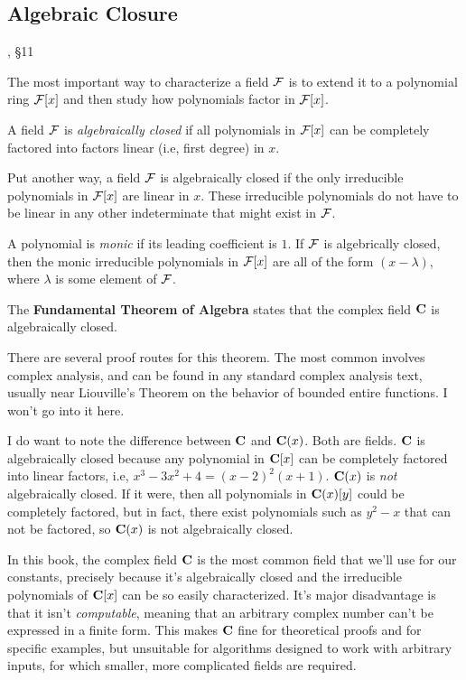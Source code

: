 \subsection*{\qquad Algebraic Closure}
, \S11

The most important way to characterize a field ${\cal F}$ is to extend
it to a polynomial ring ${\cal F}[x]$ and then study how polynomials
factor in ${\cal F}[x]$.

\begin{key point}
A field ${\cal F}$ is {\it algebraically closed} if all
polynomials in ${\cal F}[x]$ can be completely factored
into factors linear (i.e, first degree) in $x$.
\end{key point}

Put another way, a field ${\cal F}$ is algebraically closed if the
only irreducible polynomials in ${\cal F}[x]$ are linear in $x$.
These irreducible polynomials do not have to be linear in any other
indeterminate that might exist in ${\cal F}$.

A polynomial is {\it monic} if its leading coefficient is $1$.  If
${\cal F}$ is algebrically closed, then the monic irreducible
polynomials in ${\cal F}[x]$ are all of the form $(x-\lambda)$, where
$\lambda$ is some element of ${\cal F}$.

\begin{key point}
The {\bf Fundamental Theorem of
Algebra} states that the complex field ${\bf C}$ is algebraically
closed.
\end{key point}

There are several proof routes for this theorem.  The most
common involves complex analysis, and can be found in any standard
complex analysis text, usually near Liouville's Theorem on the
behavior of bounded entire functions.  I won't go into it here.

I do want to note the difference between ${\bf C}$ and ${\bf C}(x)$.
Both are fields.  ${\bf C}$ is algebraically closed because any
polynomial in ${\bf C}[x]$ can be completely factored into linear
factors, i.e, $x^3-3x^2+4=(x-2)^2(x+1)$.  ${\bf C}(x)$ is {\it not} algebraically closed.
If it were, then all polynomials in ${\bf C}(x)[y]$ could
be completely factored, but in fact, there exist polynomials
such as $y^2-x$ that can not be factored, so ${\bf C}(x)$
is not algebraically closed.

In this book, the complex field ${\bf C}$ is the most common field
that we'll use for our constants, precisely because it's algebraically
closed and the irreducible polynomials of ${\bf C}[x]$ can be so
easily characterized.  It's major disadvantage is that it isn't {\it
computable}, meaning that an arbitrary complex number can't be
expressed in a finite form.  This makes ${\bf C}$ fine for theoretical
proofs and for specific examples, but unsuitable for algorithms
designed to work with arbitrary inputs, for which smaller,
more complicated fields are required.


